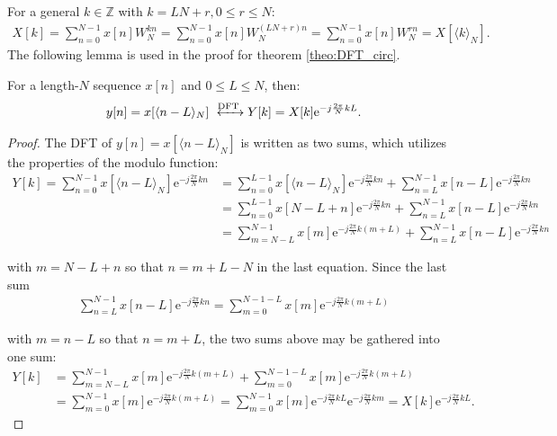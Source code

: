 For a general $k\in\mathbb{Z}$ with $k = LN + r, 0 \leq r \leq N$:
\begin{align*}
X[k] = \sum_{n=0}^{N-1} x[n] W_N^{kn} = \sum_{n=0}^{N-1} x[n] W_N^{(LN+r)n} = \sum_{n=0}^{N-1} x[n] W_N^{rn} = X[\langle k\rangle_N].
\end{align*}
The following lemma is used in the proof for theorem \ref{theo:DFT_circ}.

\begin{lemma}
For a length-$N$ sequence $x[n]$ and $0 \leq L \leq N$, then:
\begin{align*}
y[n]  = x[\langle n-L\rangle_N] \xleftrightarrow{\text{DFT}} Y[k] = X[k] \text{e}^{-j\frac{2\pi}{N} kL}.
\end{align*}
\end{lemma}

\begin{proof}
The DFT of $y[n] = x[\langle n-L\rangle_N]$ is written as two sums, which utilizes the properties of the modulo function:
\begin{align*}
Y[k] = \sum_{n=0}^{N-1} x[\langle n-L\rangle_N] \text{e}^{-j\frac{2\pi}{N} kn} &= \sum_{n=0}^{L-1} x[\langle n-L\rangle_N]\text{e}^{-j\frac{2\pi}{N} kn} + \sum_{n=L}^{N-1} x[n-L]\text{e}^{-j\frac{2\pi}{N} kn} \\
&= \sum_{n=0}^{L-1} x[N-L+n]\text{e}^{-j\frac{2\pi}{N} kn} + \sum_{n=L}^{N-1} x[n-L]\text{e}^{-j\frac{2\pi}{N} kn} \\
&= \sum_{m=N-L}^{N-1} x[m]\text{e}^{-j\frac{2\pi}{N} k(m+L)} + \sum_{n=L}^{N-1} x[n-L]\text{e}^{-j\frac{2\pi}{N} kn}
\end{align*}

with $m = N - L + n$ so that $n = m + L - N$ in the last equation. Since the last sum
\begin{align*}
\sum_{n=L}^{N-1} x[n-L]\text{e}^{-j\frac{2\pi}{N} kn} = \sum_{m=0}^{N-1-L} x[m] \text{e}^{-j\frac{2\pi}{N}k(m+L)}
\end{align*}

with $m = n - L$ so that $n = m + L$, the two sums above may be gathered into one sum:
\begin{align*}
Y[k] &= \sum_{m=N-L}^{N-1} x[m]\text{e}^{-j\frac{2\pi}{N} k(m+L)} + \sum_{m=0}^{N-1-L} x[m] \text{e}^{-j\frac{2\pi}{N}k(m+L)}  \\
&= \sum_{m=0}^{N-1} x[m] \text{e}^{-j\frac{2\pi}{N}k(m+L)} = \sum_{m=0}^{N-1} x[m] \text{e}^{-j\frac{2\pi}{N}kL}\text{e}^{-j\frac{2\pi}{N}km} = X[k] \text{e}^{-j\frac{2\pi}{N}kL}.
\end{align*}
\end{proof}

